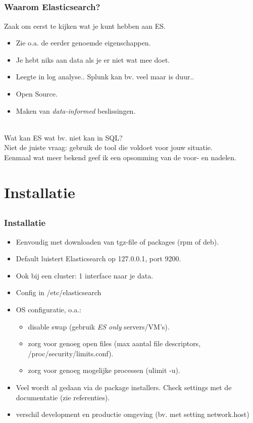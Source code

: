 \subsection{}
\begin{styleframe}
	\frametitle{Waarom Elasticsearch?}
Zaak om eerst te kijken wat je kunt hebben aan ES.
\begin{itemize}[<+>]
	\item Zie o.a. de eerder genoemde eigenschappen.
	\item Je hebt niks aan data als je er niet wat mee doet.
	\item Leegte in log analyse.. Splunk kan bv. veel maar is duur..
	\item Open Source.
	\item Maken van {\it data-informed} beslissingen.
\end{itemize}
~\\
\pause
Wat kan ES wat bv. niet kan in SQL?\\
\pause
Niet de juiste vraag: gebruik de tool die voldoet voor jouw situatie.\\
\pause
Eenmaal wat meer bekend geef ik een opsomming van de voor- en nadelen.
\end{styleframe}

\section{Installatie}
\subsection{}
\begin{styleframe}
	\frametitle{Installatie}
\begin{itemize}[<+>]
	\item Eenvoudig met downloaden van tgz-file of packages (rpm of deb).
	\item Default luistert Elasticsearch op 127.0.0.1, port 9200.
	\item Ook bij een cluster: 1 interface naar je data.\\
	\item Config in /etc/elasticsearch
	\item OS configuratie, o.a.:
	\begin{itemize}
		\item disable swap (gebruik {\it ES only} servers/VM's). \only<1>{Only 1st slide}
		\item zorg voor genoeg open files (max aantal file descriptors, /proc/security/limits.conf).
		\item zorg voor genoeg mogelijke processen (ulimit -u).
	\end{itemize}
	\item[] Veel wordt al gedaan via de package installers. Check settings met de documentatie (zie referenties).
	\item verschil development en productie omgeving (bv. met setting network.host)
\end{itemize}
\end{styleframe}

